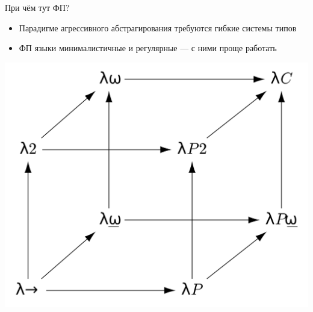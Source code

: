     \begin{frame}{При чём тут ФП?}
        \begin{itemize}
            \item Парадигме агрессивного абстрагирования требуются гибкие системы типов
            \item ФП языки минималистичные и регулярные --- с ними проще работать
        \end{itemize}
        \begin{center}
            \includegraphics[height=0.6\textheight]{figs/cube}
        \end{center}
    \end{frame}



